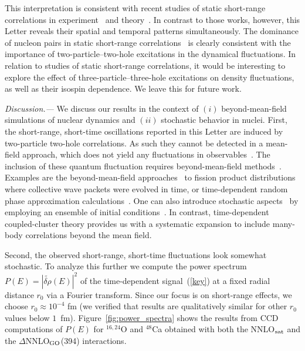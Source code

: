 \documentclass[aps,prc,twocolumn,showpacs,floatfix,nofootinbib,superscriptaddress,amsmath,amssymb,longbibliography,amsproc]{revtex4-2}
\begin{document}
This interpretation is consistent with recent studies of static short-range correlations in experiment~\cite{subedi2008,fomin2012,hen2014,duer2019,schmidt2020} and theory~\cite{schiavilla2007,wiringa2014,weiss2015,weiss2018,weiss2019,lynn2020,pastore2020,weiss2021,tropiano2021,tropiano2024}. In contrast to those works, however, this Letter reveals their spatial and temporal patterns simultaneously. The dominance of nucleon pairs in static short-range correlations~\cite{korover2023,beck2023} is clearly consistent with the importance of two-particle--two-hole excitations in the dynamical fluctuations. In relation to studies of static short-range correlations, it would be interesting to explore the effect of three-particle--three-hole excitations on density fluctuations, as well as their isospin dependence. We leave this for future work.

\textit{Discussion.---} We discuss our results in the context of $(i)$ beyond-mean-field simulations of nuclear dynamics and $(ii)$ stochastic behavior in nuclei.
First, the short-range, short-time oscillations reported in this Letter are induced by two-particle two-hole correlations. As such they cannot be detected in a mean-field approach, which does not yield any fluctuations in observables~\cite{balian1984,simenel2025}. The inclusion of these quantum fluctuation requires beyond-mean-field methods~\cite{hoodbhoy78,hoodbhoy79,balian1992,simenel2025}. Examples are the beyond-mean-field approaches~\cite{goutte2005,regnier2016} to fission product distributions where collective wave packets were evolved in time, or time-dependent random phase approximation calculations~\cite{simenel2020}. One can also introduce stochastic aspects~\cite{abe1996,frobich1998} by employing an ensemble of initial conditions~\cite{ayik2008}.
In contrast, time-dependent coupled-cluster theory provides us with a systematic expansion to include many-body correlations beyond the mean field.

Second, the observed short-range, short-time fluctuations look somewhat stochastic. To analyze this further we compute the power spectrum $P(E) = |\widetilde{\delta\rho}(E)|^2$ of the  time-dependent signal~(\ref{key}) at a fixed radial distance $r_0$ via a Fourier transform. Since our focus is on short-range effects, we choose $r_0 \approx 10^{-4}$ fm (we verified that results are qualitatively similar for other $r_0$ values below $1$~fm). Figure~\ref{fig:power_spectra} shows the results from CCD computations of $P(E)$ for $^{16,24}$O and $^{48}$Ca obtained with both the NNLO$_{\rm sat}$ and the $\Delta$NNLO$_{\rm GO}$(394) interactions.
\end{document}
